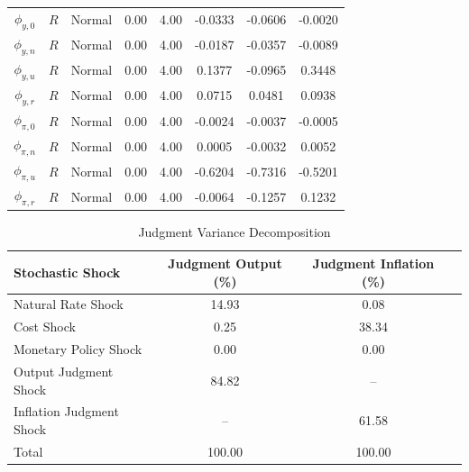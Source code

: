 \documentclass[12pt]{article}
\begin{document}
{\begin{table}
\begin{center}
\begin{tabular}{c|c||c|cc||c|cc}
$\phi_{y,0}$ & $R$ & Normal & 0.00 & 4.00 & -0.0333 & -0.0606 & -0.0020 \\ 
$\phi_{y,n}$ & $R$ & Normal & 0.00 & 4.00 & -0.0187 & -0.0357 & -0.0089 \\ 
$\phi_{y,u}$ & $R$ & Normal & 0.00 & 4.00 & 0.1377 & -0.0965 & 0.3448 \\ 
$\phi_{y,r}$ & $R$ & Normal & 0.00 & 4.00 & 0.0715 & 0.0481 & 0.0938 \\ 
$\phi_{\pi,0}$ & $R$ & Normal & 0.00 & 4.00 & -0.0024 & -0.0037 & -0.0005 \\ 
$\phi_{\pi,n}$ & $R$ & Normal & 0.00 & 4.00 & 0.0005 & -0.0032 & 0.0052 \\ 
$\phi_{\pi,u}$ & $R$ & Normal & 0.00 & 4.00 & -0.6204 & -0.7316 & -0.5201 \\ 
$\phi_{\pi,r}$ & $R$ & Normal & 0.00 & 4.00 & -0.0064 & -0.1257 & 0.1232 \\ \hline
\end{tabular}
\end{center}
\end{table}

\begin{table}\caption{Judgment Variance Decomposition}\label{tb:newsdec}
\begin{center}
\vspace*{1pc}
\begin{tabular}{l|c|cc} \hline
Stochastic Shock & Judgment Output (\%) & Judgment Inflation (\%) \\ \hline
Natural Rate Shock & 14.93 & 0.08  \\
Cost Shock & 0.25 & 38.34  \\
Monetary Policy Shock & 0.00 & 0.00 \\
Output Judgment Shock & 84.82 & -- \\
Inflation Judgment Shock & -- & 61.58 \\ \hline
Total & 100.00 & 100.00 \\ \hline
\end{tabular}
\end{center}
\end{table}

}
\end{document}
